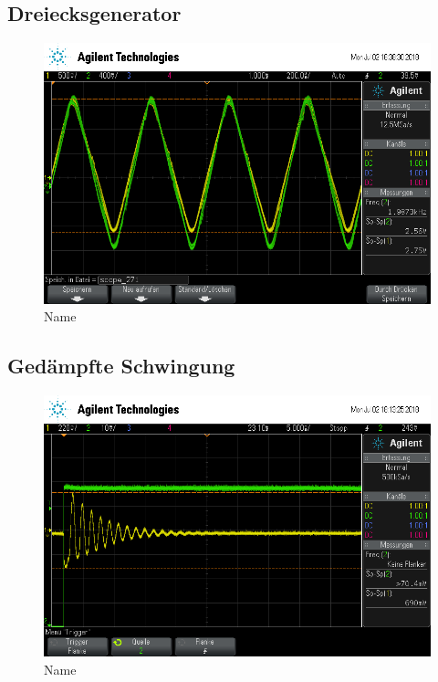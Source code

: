 \subsection{Dreiecksgenerator}
\begin{figure}[ht]
  \centering
  \includegraphics[height=0.3\textheight]{data/scope_271.png}
  \caption{Name}
  \label{fig:name}
\end{figure}

\subsection{Ged\"ampfte Schwingung}
\begin{figure}[ht]
  \centering
  \includegraphics[height=0.3\textheight]{data/scope_275.png}
  \caption{Name}
  \label{fig:name}
\end{figure}

